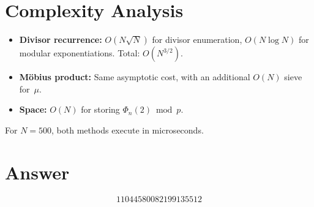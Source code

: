 \documentclass[11pt]{article}
\begin{document}
\section{Complexity Analysis}

\begin{itemize}
\item \textbf{Divisor recurrence:} $O(N\sqrt{N})$ for divisor enumeration, $O(N \log N)$ for modular exponentiations. Total: $O(N^{3/2})$.
\item \textbf{M\"obius product:} Same asymptotic cost, with an additional $O(N)$ sieve for~$\mu$.
\item \textbf{Space:} $O(N)$ for storing $\Phi_n(2) \bmod p$.
\end{itemize}

For $N = 500$, both methods execute in microseconds.

\section{Answer}

\[
\boxed{11044580082199135512}
\]
\end{document}
